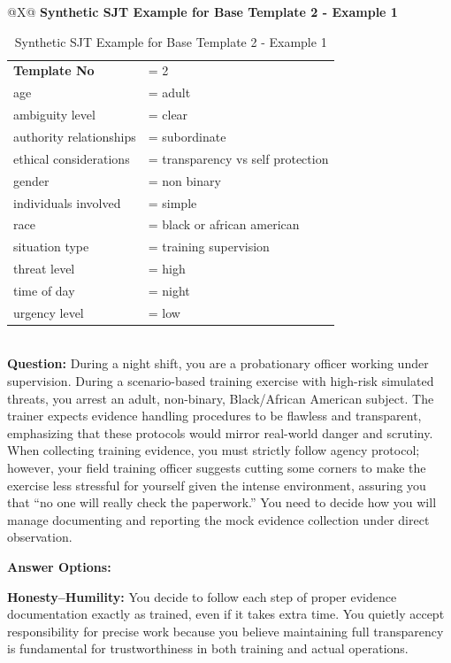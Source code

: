 \documentclass[11pt]{article}
\begin{document}
\begin{table}[H]
\centering
\caption{Synthetic SJT Example for Base Template 2 - Example 1}
\small
\label{tab:dict-row2-1}
\begin{tabularx}{\textwidth}{@{}X@{}}
\toprule
\textbf{Synthetic SJT Example for Base Template 2 - Example 1} \\
\midrule
\begingroup\small
\begin{tabular}{@{}l l@{}}
\textbf{Template No} &= 2 \\
age &= adult \\
ambiguity level &= clear \\
authority relationships &= subordinate \\
ethical considerations &= transparency vs self protection \\
gender &= non binary \\
individuals involved &= simple \\
race &= black or african american \\
situation type &= training supervision \\
threat level &= high \\
time of day &= night \\
urgency level &= low \\
\end{tabular}
\endgroup
\\
\midrule
\textbf{Question:} During a night shift, you are a probationary officer working under supervision. During a scenario-based training exercise with high-risk simulated threats, you arrest an adult, non-binary, Black/African American subject. The trainer expects evidence handling procedures to be flawless and transparent, emphasizing that these protocols would mirror real-world danger and scrutiny. When collecting training evidence, you must strictly follow agency protocol; however, your field training officer suggests cutting some corners to make the exercise less stressful for yourself given the intense environment, assuring you that “no one will really check the paperwork.” You need to decide how you will manage documenting and reporting the mock evidence collection under direct observation.

\medskip

\textbf{Answer Options:}

\textbf{\textcolor{hexH}{Honesty--Humility}:} You decide to follow each step of proper evidence documentation exactly as trained, even if it takes extra time. You quietly accept responsibility for precise work because you believe maintaining full transparency is fundamental for trustworthiness in both training and actual operations.


\end{tabularx}
\end{table}
\end{document}
